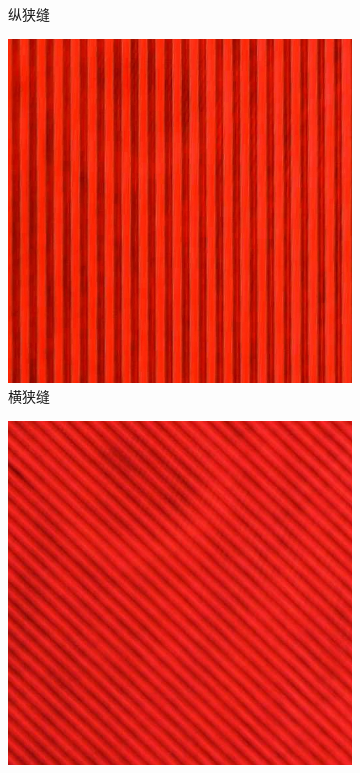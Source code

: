 \documentclass[a4paper]{article}
\begin{document}
\begin{figure}[H]
\begin{subfigure}[t]{0.4\textwidth}
        \caption{纵狭缝}
        \label{fig5-2}
    \end{subfigure}
    \begin{subfigure}[t]{0.4\textwidth}
        \centering
        \includegraphics[height=\textheight/5]{img2-done/4-4.JPG}
        \caption{横狭缝}
        \label{fig5-3}
    \end{subfigure}
    \begin{subfigure}[t]{0.4\textwidth}
        \centering
        \includegraphics[height=\textheight/5]{img2-done/4-5.JPG}

\end{subfigure}
\end{figure}
\end{document}
